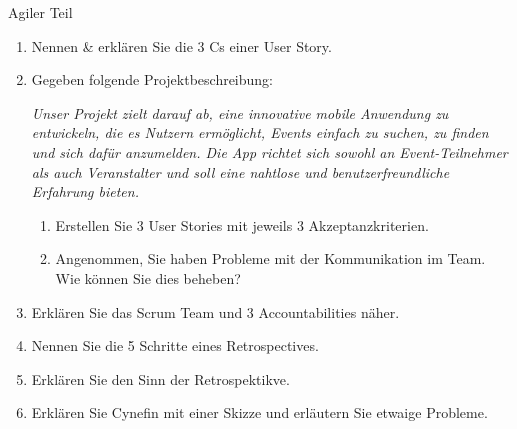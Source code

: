 \documentclass{article}
\begin{document}
\begin{exercise}{Agiler Teil}
  \begin{enumerate}
    \item Nennen \& erklären Sie die 3 Cs einer User Story.
    \item Gegeben folgende Projektbeschreibung:
          \par \textit{Unser Projekt zielt darauf ab, eine innovative mobile Anwendung zu entwickeln, die es Nutzern ermöglicht, Events einfach zu suchen, zu finden und sich dafür anzumelden. Die App richtet sich sowohl an Event-Teilnehmer als auch Veranstalter und soll eine nahtlose und benutzerfreundliche Erfahrung bieten.}
          \begin{enumerate}
            \item Erstellen Sie 3 User Stories mit jeweils 3 Akzeptanzkriterien.
            \item Angenommen, Sie haben Probleme mit der Kommunikation im Team. Wie können Sie dies beheben?
          \end{enumerate}
    \item Erklären Sie das Scrum Team und 3 Accountabilities näher.
    \item Nennen Sie die 5 Schritte eines Retrospectives.
    \item Erklären Sie den Sinn der Retrospektikve.
    \item Erklären Sie Cynefin mit einer Skizze und erläutern Sie etwaige Probleme.
  \end{enumerate}


\end{exercise}
\end{document}
